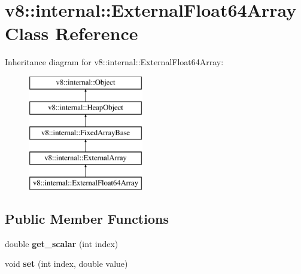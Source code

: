 \hypertarget{classv8_1_1internal_1_1_external_float64_array}{}\section{v8\+:\+:internal\+:\+:External\+Float64\+Array Class Reference}
\label{classv8_1_1internal_1_1_external_float64_array}
Inheritance diagram for v8\+:\+:internal\+:\+:External\+Float64\+Array\+:\begin{figure}[H]
\begin{center}
\leavevmode
\includegraphics[height=5.000000cm]{classv8_1_1internal_1_1_external_float64_array}
\end{center}
\end{figure}
\subsection*{Public Member Functions}
\begin{DoxyCompactItemize}
\item 
\hypertarget{classv8_1_1internal_1_1_external_float64_array_a73ad30a1cb9ffc53a3eaa04a6afa6401}{}double {\bfseries get\+\_\+scalar} (int index)\label{classv8_1_1internal_1_1_external_float64_array_a73ad30a1cb9ffc53a3eaa04a6afa6401}

\item 
\hypertarget{classv8_1_1internal_1_1_external_float64_array_afc102324281130a1a7444e3b8b3dc0c5}{}void {\bfseries set} (int index, double value)\label{classv8_1_1internal_1_1_external_float64_array_afc102324281130a1a7444e3b8b3dc0c5}

\end{DoxyCompactItemize}

